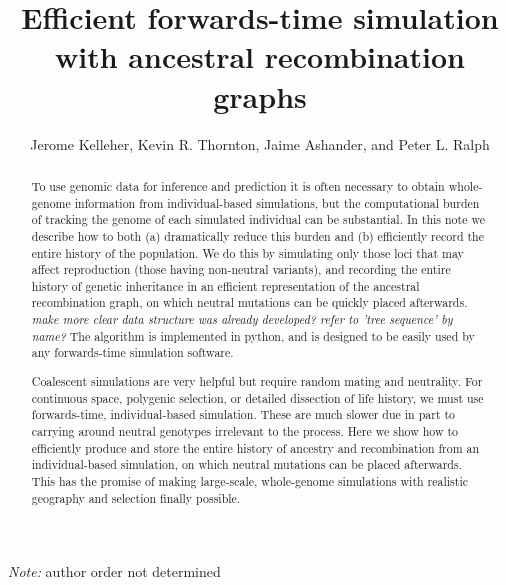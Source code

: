 \documentclass{article}
\newcommand{\plr}[1]{{\em \color{blue} #1}}
\begin{document}
\title{Efficient forwards-time simulation with ancestral recombination graphs}
\author{Jerome Kelleher,
        Kevin R. Thornton,
        Jaime Ashander, and
        Peter L. Ralph}
\maketitle

\emph{Note:} author order not determined

\begin{abstract}
    To use genomic data for inference and prediction
    it is often necessary to obtain whole-genome information
    from individual-based simulations,
    but the computational burden of tracking the genome of each simulated individual can be substantial.
    In this note we describe how to both (a) dramatically reduce this burden and
    (b) efficiently record the entire history of the population.
    We do this by simulating only those loci that may affect reproduction (those having non-neutral variants),
    and recording the entire history of genetic inheritance in an efficient representation of the ancestral recombination graph,
    on which neutral mutations can be quickly placed afterwards.
    \plr{make more clear data structure was already developed? refer to 'tree sequence' by name?}
    The algorithm is implemented in python,
    and is designed to be easily used by any forwards-time simulation software.

    Coalescent simulations are very helpful but require random mating and neutrality.
    For continuous space, polygenic selection, or detailed dissection of life history,
    we must use forwards-time, individual-based simulation.
    These are much slower due in part to carrying around neutral genotypes irrelevant to the process.
    Here we show how to efficiently produce and store the entire history of ancestry and recombination
    from an individual-based simulation,
    on which neutral mutations can be placed afterwards.
    This has the promise of making large-scale, whole-genome simulations with realistic geography and selection finally possible.
\end{abstract}
\end{document}
